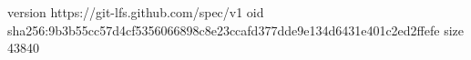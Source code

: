 version https://git-lfs.github.com/spec/v1
oid sha256:9b3b55cc57d4cf5356066898c8e23ccafd377dde9e134d6431e401c2ed2ffefe
size 43840
